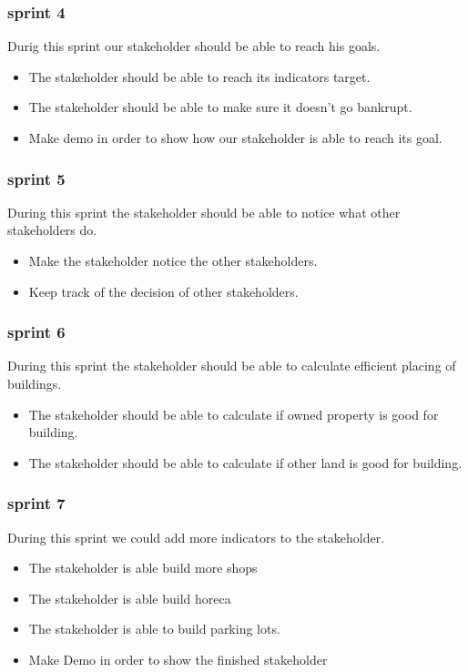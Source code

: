 \subsubsection{sprint 4}
Durig this sprint our stakeholder should be able to reach his goals.
\begin{itemize}
	\item The stakeholder should be able to reach its indicators target.
	\item The stakeholder should be able to make sure it doesn't go bankrupt.
	\item Make demo in order to show how our stakeholder is able to reach its goal.
\end{itemize} 

\subsubsection{sprint 5}
During this sprint the stakeholder should be able to notice what other stakeholders do.
\begin{itemize}
	\item Make the stakeholder notice the other stakeholders.
	\item Keep track of the decision of other stakeholders.
\end{itemize}

\subsubsection{sprint 6}
During this sprint the stakeholder should be able to calculate efficient placing of buildings.
\begin{itemize}
	\item The stakeholder should be able to calculate if owned property is good for building.
	\item The stakeholder should be able to calculate if other land is good for building.
\end{itemize}


\subsubsection{sprint 7}
During this sprint we could add more indicators to the stakeholder.
\begin{itemize}
	\item The stakeholder is able build more shops
	\item The stakeholder is able build horeca
	\item The stakeholder is able to build parking lots.
	\item Make Demo in order to show the finished stakeholder
\end{itemize}


